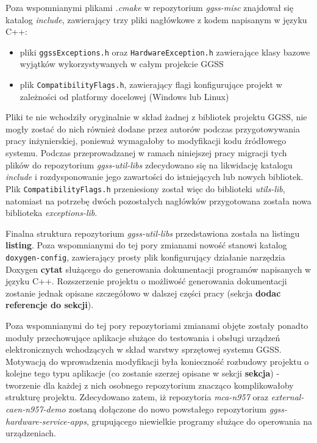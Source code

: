 Poza wspomnianymi plikami \emph{.cmake} w repozytorium \emph{ggss-misc} znajdował się katalog \emph{include}, zawierający trzy pliki nagłówkowe z kodem napisanym w języku C++:
\begin{itemize}
    \item pliki \lstinline{ggssExceptions.h} oraz \lstinline{HardwareException.h} zawierające klasy bazowe wyjątków wykorzystywanych w całym projekcie GGSS
    \item plik \lstinline{CompatibilityFlags.h}, zawierający flagi konfigurujące projekt w zależności od platformy docelowej (Windows lub Linux)
\end{itemize}
Pliki te nie wchodziły oryginalnie w skład żadnej z bibliotek projektu GGSS, nie mogły zostać do nich również dodane przez autorów podczas przygotowywania pracy inżynierskiej, ponieważ wymagałoby to modyfikacji kodu źródłowego systemu. Podczas przeprowadzanej w ramach niniejszej pracy migracji tych plików do repozytorium \emph{ggss-util-libs} zdecydowano się na likwidację katalogu \emph{include} i rozdysponowanie jego zawartości do istniejących lub nowych bibliotek. Plik \lstinline{CompatibilityFlags.h} przeniesiony został więc do biblioteki \emph{utils-lib}, natomiast na potrzebę dwóch pozostałych nagłówków przygotowana została nowa biblioteka \emph{exceptions-lib}. 

Finalna struktura repozytorium \emph{ggss-util-libs} przedstawiona została na listingu \textbf{listing}. Poza wspomnianymi do tej pory zmianami nowość stanowi katalog \lstinline{doxygen-config}, zawierający prosty plik konfigurujący działanie narzędzia Doxygen \textbf{cytat} służącego do generowania dokumentacji programów napisanych w języku C++. Rozszerzenie projektu o możliwość generowania dokumentacji zostanie jednak opisane szczegółowo w dalszej części pracy (sekcja \textbf{dodac referencje do sekcji}).


Poza wspomnianymi do tej pory repozytoriami zmianami objęte zostały ponadto moduły przechowujące aplikacje służące do testowania i obsługi urządzeń elektronicznych wchodzących w skład warstwy sprzętowej systemu GGSS. Motywacją do wprowadzenia modyfikacji była konieczność rozbudowy projektu o kolejne tego typu aplikacje (co zostanie szerzej opisane w sekcji \textbf{sekcja}) - tworzenie dla każdej z nich osobnego repozytorium znacząco komplikowałoby strukturę projektu. Zdecydowano zatem, iż repozytoria \emph{mca-n957} oraz \emph{external-caen-n957-demo} zostaną dołączone do nowo powstałego repozytorium \emph{ggss-hardware-service-apps}, grupującego niewielkie programy służące do operowania na urządzeniach.


